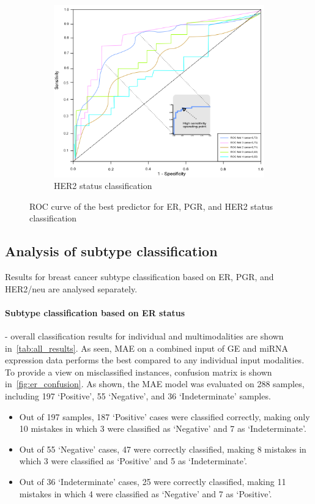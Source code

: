 \begin{figure}
\begin{subfigure}{0.49\linewidth}
		\includegraphics[width=0.9\linewidth]{images/roc_her2.png}
		\caption{HER2 status classification }
        \label{fig:her2_roc}
	\end{subfigure}
	\caption{ROC curve of the best predictor for ER, PGR, and HER2 status classification~\cite{karimACCESS2019}} 
	\label{fig:roc_all}
\end{figure}
\fi 

\subsection{Analysis of subtype classification}
Results for breast cancer subtype classification based on ER, PGR, and HER2/neu are analysed separately. 

\paragraph{Subtype classification based on ER status} - overall classification results for individual and multimodalities are shown in~\cref{tab:all_results}. As seen, MAE on a combined input of GE and miRNA expression data performs the best compared to any individual input modalities. To provide a view on misclassified instances, confusion matrix is shown in~\cref{fig:er_confusion}. As shown, the MAE model was evaluated on 288 samples, including 197 `Positive', 55 `Negative', and 36 `Indeterminate' samples. 

\begin{itemize}[noitemsep]
    \item Out of 197 samples, 187 `Positive' cases were classified correctly, making only 10 mistakes in which 3 were classified as `Negative' and 7 as `Indeterminate'. 

    \item Out of 55 `Negative' cases, 47 were correctly classified, making 8 mistakes in which 3 were classified as `Positive' and 5 as `Indeterminate'. 

    \item Out of 36 `Indeterminate' cases, 25 were correctly classified, making 11 mistakes in which 4 were classified as `Negative' and 7 as `Positive'.  
\end{itemize}

